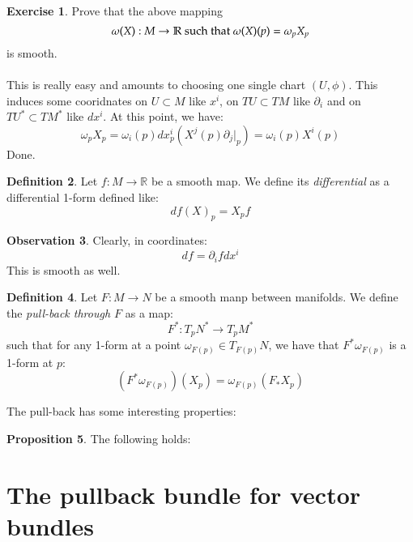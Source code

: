 \documentclass[12pt,a4paper]{report}
\theoremstyle{definition}
\newtheorem{Def}{Definition}[chapter]
\theoremstyle{Theorem}
\newtheorem{Prop}[Def]{Proposition}
\theoremstyle{break}
\newtheorem{Exe}[Def]{Exercise}
\theoremstyle{definition}
\newtheorem{Obs}[Def]{Observation}
\begin{document}
		\begin{Exe}
			Prove that the above mapping
			$$\omega(X):M\rightarrow \mathbb{R}\hbox{ such that }\omega(X)(p)=\omega_pX_p$$
			is smooth.\\
			\\
			This is really easy and amounts to choosing one single chart $(U,\phi)$. This induces some cooridnates on $U\subset M$ like $x^i$, on $TU\subset TM$ like $\partial_i$ and on $TU^*\subset TM^*$ like $dx^i$. At this point, we have:
			$$\omega_pX_p=\omega_i(p)dx_p^i(X^j(p)\partial_j\big|_p)=\omega_i(p)X^i(p)$$
			Done.
		\end{Exe}
		\begin{Def}
			Let $f:M\rightarrow \mathbb{R}$ be a smooth map. We define its \textit{differential} as a differential 1-form defined like:
			$$df(X)_p=X_pf$$
		\end{Def}
		\begin{Obs}
			Clearly, in coordinates:
			$$df=\partial_i fdx^i$$
			This is smooth as well.
		\end{Obs}
		\begin{Def}
			Let $F:M\rightarrow N$ be a smooth manp between manifolds. We define the \textit{pull-back through $F$} as a map:
			$$F^*:T_pN^*\rightarrow T_pM^*$$
			such that for any 1-form at a point $\omega_{F(p)}\in T_{F(p)}N$, we have that $F^*\omega_{F(p)}$ is a 1-form at $p$:
			$$(F^*\omega_{F(p)})(X_p)=\omega_{F(p)}(F_*X_p)$$ 
		\end{Def}
		The pull-back has some interesting properties:
		\begin{Prop}
			The following holds:
		\end{Prop}
		\section{The pullback bundle for vector bundles}
\end{document}
